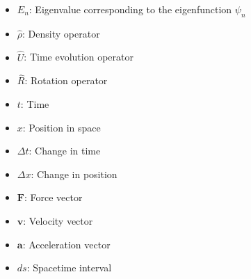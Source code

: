 \documentclass[class=book, crop=false]{standalone}
\begin{document}
\begin{itemize}
    \item $E_n$: Eigenvalue corresponding to the eigenfunction $\psi_n$
    \item $\hat{\rho}$: Density operator
    \item $\hat{U}$: Time evolution operator
    \item $\hat{R}$: Rotation operator
    \item $t$: Time
    \item $x$: Position in space
    \item $\Delta t$: Change in time
    \item $\Delta x$: Change in position
    \item $\mathbf{F}$: Force vector
    \item $\mathbf{v}$: Velocity vector
    \item $\mathbf{a}$: Acceleration vector
    \item $ds$: Spacetime interval
\end{itemize}
\end{document}
